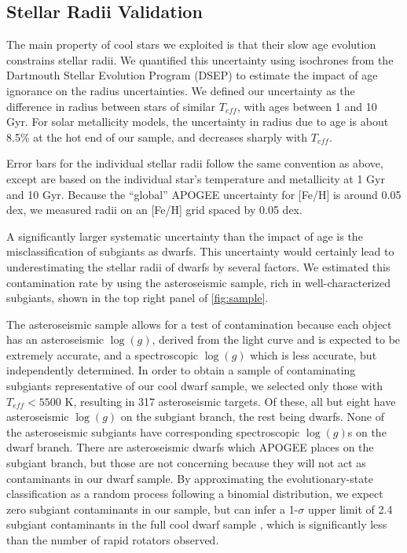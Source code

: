 \documentclass[manuscript]{aastex6}
\newcommand{\Teff}{\ensuremath{T_{eff}}}
\newcommand{\logg}{\ensuremath{\log(g)}}
\begin{document}
\subsection{Stellar Radii Validation}
\label{sec:radii}

The main property of cool stars we exploited is that their slow age evolution
constrains stellar radii. We quantified this uncertainty using isochrones from 
the Dartmouth Stellar Evolution Program (DSEP) to estimate the impact of age 
ignorance on the radius uncertainties. We defined our uncertainty as the 
difference in radius between stars of similar \Teff{}, with ages between 1 
and 10 Gyr. For solar metallicity models, the uncertainty in radius due to 
age is about 8.5\% at the hot end of our sample, and decreases sharply with 
\Teff. 

Error bars for the individual stellar radii follow the same convention as
above, except are based on the individual star's temperature and metallicity 
at 1 Gyr and 10 Gyr. Because the ``global'' APOGEE uncertainty for [Fe/H] is 
around 0.05 dex, we measured radii on an [Fe/H] grid spaced by 0.05 dex.

A significantly larger systematic uncertainty than the impact of age is the 
misclassification of
subgiants as dwarfs. This uncertainty would certainly lead to underestimating
the stellar radii of dwarfs by several factors. We estimated this
contamination rate by using the asteroseismic sample, rich in
well-characterized subgiants, shown in the top right
panel of \cref{fig:sample}.

The asteroseismic sample allows for a test of contamination because each
object has an asteroseismic \logg{}, derived from the light curve and is
expected to be extremely accurate, and a spectroscopic \logg{} which is
less accurate, but independently determined. In order to obtain a sample of 
contaminating subgiants representative of our cool dwarf sample, we
selected only those with \(\Teff < 5500\) K, resulting in 317
asteroseismic targets. Of these, all but eight have asteroseismic \logg{} on 
the subgiant branch, the rest being dwarfs. None of the asteroseismic
subgiants have corresponding spectroscopic \logg{}s on the 
dwarf branch. There are asteroseismic dwarfs which APOGEE places on the
subgiant branch, but those are not concerning because they will not act as 
contaminants in our dwarf sample. By approximating the evolutionary-state 
classification as a random process following a binomial distribution, we
expect zero subgiant contaminants in our sample, but can infer a 1-\(\sigma\) 
upper limit of 2.4 subgiant contaminants in the full cool dwarf sample
\citep{Gehrels86}, which is significantly less than the number of rapid
rotators observed. 
\end{document}
